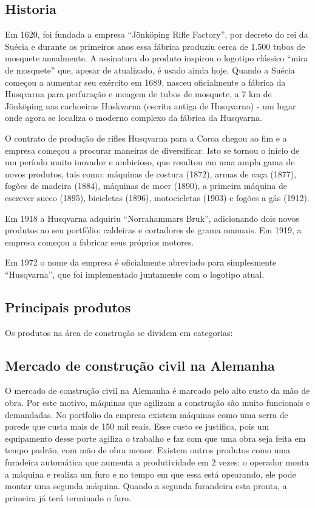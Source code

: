 \documentclass[12pt]{article}
\begin{document}
	
\subsection{Historia}
	Em 1620, foi fundada a empresa “Jönköping Rifle Factory”, por decreto do rei da Suécia e durante os primeiros anos essa fábrica produziu cerca de 1.500 tubos de mosquete anualmente. A assinatura do produto inspirou o logotipo clássico “mira de mosquete” que, apesar de atualizado, é usado ainda hoje.
Quando a Suécia começou a aumentar seu exército em 1689, nasceu oficialmente a fábrica da Husqvarna para perfuração e moagem de tubos de mosquete, a 7 km de Jönköping nas cachoeiras Huskvarna (escrita antiga de Husqvarna) - um lugar onde agora se localiza o moderno complexo da fábrica da Husqvarna.

	O contrato de produção de rifles Husqvarna para a Coroa chegou ao fim e a empresa começou a procurar maneiras de diversificar. Isto se tornou o início de um período muito inovador e ambicioso, que resultou em uma ampla gama de novos produtos, tais como: máquinas de costura (1872), armas de caça (1877), fogões de madeira (1884), máquinas de moer (1890), a primeira máquina de escrever sueco (1895), bicicletas (1896), motocicletas (1903) e fogões a gás (1912).

	Em 1918 a Husqvarna adquiriu “Norrahammars Bruk”, adicionando dois novos produtos ao seu portfólio: caldeiras e cortadores de grama manuais. Em 1919, a empresa começou a fabricar seus próprios motores.

	Em 1972 o nome da empresa é oficialmente abreviado para simplesmente “Husqvarna”, que foi implementado juntamente com o logotipo atual.

\subsection{Principais produtos}
Os produtos na área de construção se dividem em categorias:

\subsection{Mercado de construção civil na Alemanha}
	O mercado de construção civil na Alemanha é marcado pelo alto custo da mão de obra. Por este motivo, máquinas que agilizam a construção são muito funcionais e demandadas. No portfolio da empresa existem máquinas como uma serra de parede que custa mais de 150 mil reais. Esse custo se justifica, pois um equipamento desse porte agiliza o trabalho e faz com que uma obra seja feita em tempo padrão, com mão de obra menor. Existem outros produtos como uma furadeira automática que aumenta a produtividade em 2 vezes: o operador monta a máquina e realiza um furo e no tempo em que essa está opearando, ele pode montar uma segunda máquina. Quando a segunda furandeira esta pronta, a primeira já terá terminado o furo.
\end{document}
